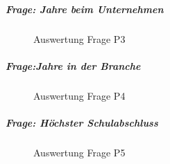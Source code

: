 \documentclass[../../main.tex]{subfiles}
\begin{document}
\subparagraph*{Frage: Jahre beim Unternehmen}\mbox{}
\begin{figure}[H]
\centering
{}
\caption{Auswertung Frage P3}
\label{P3}
\end{figure}

\subparagraph*{Frage:Jahre in der Branche}\mbox{}
\begin{figure}[H]
\centering
{}
\caption{Auswertung Frage P4}
\label{P4}
\end{figure}

\subparagraph*{Frage: Höchster Schulabschluss}\mbox{}
\begin{figure}[H]
\centering
{}
\caption{Auswertung Frage P5}
\label{P5}
\end{figure}
\end{document}
